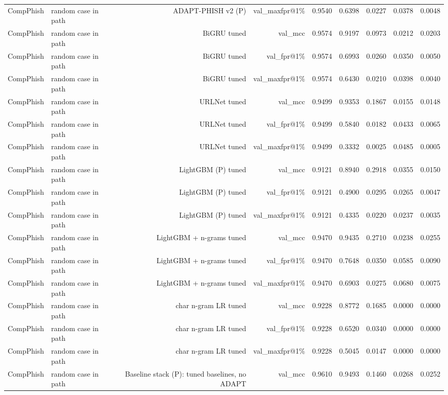 \begin{table}[t]
\begin{tabular}{llrrrrrrr}
CompPhish & random case in path & ADAPT-PHISH v2 (P) & val\_maxfpr@1\% & 0.9540 & 0.6398 & 0.0227 & 0.0378 & 0.0048 \\
CompPhish & random case in path & BiGRU tuned & val\_mcc & 0.9574 & 0.9197 & 0.0973 & 0.0212 & 0.0203 \\
CompPhish & random case in path & BiGRU tuned & val\_fpr@1\% & 0.9574 & 0.6993 & 0.0260 & 0.0350 & 0.0050 \\
CompPhish & random case in path & BiGRU tuned & val\_maxfpr@1\% & 0.9574 & 0.6430 & 0.0210 & 0.0398 & 0.0040 \\
CompPhish & random case in path & URLNet tuned & val\_mcc & 0.9499 & 0.9353 & 0.1867 & 0.0155 & 0.0148 \\
CompPhish & random case in path & URLNet tuned & val\_fpr@1\% & 0.9499 & 0.5840 & 0.0182 & 0.0433 & 0.0065 \\
CompPhish & random case in path & URLNet tuned & val\_maxfpr@1\% & 0.9499 & 0.3332 & 0.0025 & 0.0485 & 0.0005 \\
CompPhish & random case in path & LightGBM (P) tuned & val\_mcc & 0.9121 & 0.8940 & 0.2918 & 0.0355 & 0.0150 \\
CompPhish & random case in path & LightGBM (P) tuned & val\_fpr@1\% & 0.9121 & 0.4900 & 0.0295 & 0.0265 & 0.0047 \\
CompPhish & random case in path & LightGBM (P) tuned & val\_maxfpr@1\% & 0.9121 & 0.4335 & 0.0220 & 0.0237 & 0.0035 \\
CompPhish & random case in path & LightGBM + n-grams tuned & val\_mcc & 0.9470 & 0.9435 & 0.2710 & 0.0238 & 0.0255 \\
CompPhish & random case in path & LightGBM + n-grams tuned & val\_fpr@1\% & 0.9470 & 0.7648 & 0.0350 & 0.0585 & 0.0090 \\
CompPhish & random case in path & LightGBM + n-grams tuned & val\_maxfpr@1\% & 0.9470 & 0.6903 & 0.0275 & 0.0680 & 0.0075 \\
CompPhish & random case in path & char n-gram LR tuned & val\_mcc & 0.9228 & 0.8772 & 0.1685 & 0.0000 & 0.0000 \\
CompPhish & random case in path & char n-gram LR tuned & val\_fpr@1\% & 0.9228 & 0.6520 & 0.0340 & 0.0000 & 0.0000 \\
CompPhish & random case in path & char n-gram LR tuned & val\_maxfpr@1\% & 0.9228 & 0.5045 & 0.0147 & 0.0000 & 0.0000 \\
CompPhish & random case in path & Baseline stack (P): tuned baselines, no ADAPT & val\_mcc & 0.9610 & 0.9493 & 0.1460 & 0.0268 & 0.0252 \\

\end{tabular}
\end{table}
